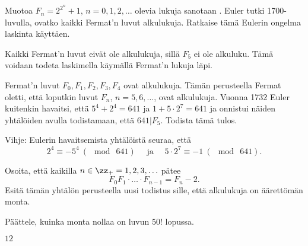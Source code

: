 \begin{tehtavasivu}
\begin{tehtava}
    Muotoa $F_n = 2^{2^n}+1$, $n=0, 1, 2, \ldots$ olevia lukuja sanotaan . Euler tutki 1700-luvulla, ovatko kaikki Fermat'n luvut alkulukuja. Ratkaise tämä Eulerin ongelma laskinta käyttäen.
    
    \begin{vastaus}
        Kaikki Fermat'n luvut eivät ole alkulukuja, sillä $F_5$ ei ole alkuluku. Tämä voidaan todeta laskimella käymällä Fermat'n lukuja läpi.
    \end{vastaus}
\end{tehtava}

\begin{tehtava}
    Fermat'n luvut $F_0, F_1, F_2, F_3, F_4$ ovat alkulukuja. Tämän perusteella Fermat oletti, että loputkin luvut $F_n$, $n=5, 6, \ldots$, ovat alkulukuja. Vuonna 1732 Euler kuitenkin havaitsi, että $5^4 + 2^4 = 641$
ja $1 + 5\cdot 2^7 = 641$ ja onnistui näiden yhtälöiden avulla todistamaan, että $641 | F_5$. Todista tämä tulos.

Vihje: Eulerin havaitsemista yhtälöistä seuraa, että
\[
2^4 \equiv -5^4\ (\mod\ 641)\quad\text{ ja }\quad5\cdot 2^7 \equiv -1\ (\mod\ 641).
\]
\end{tehtava}

\begin{tehtava}
    Osoita, että kaikilla $n\in\zz_{+}=1, 2, 3, \ldots$ pätee
\[
F_{0}F_{1}\cdot \ldots \cdot F_{n-1} = F_{n} - 2.
\]
Esitä tämän yhtälön perusteella uusi todistus sille,
että alkulukuja on äärettömän monta.
\end{tehtava}

\begin{tehtava}
    Päättele, kuinka monta nollaa on luvun $50!$ lopussa.

    \begin{vastaus}
        $12$
    \end{vastaus}
    
\end{tehtava}

\end{tehtavasivu}

\setcounter{tehtava}{0}

